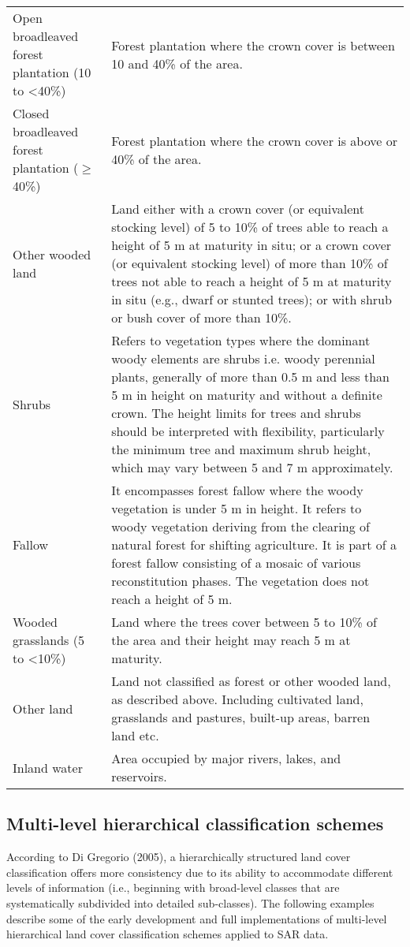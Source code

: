 \begin{spacing}{1.0}
\begin{longtable}[h!]{ p{3.5cm} p{10.5cm} }
	Open broadleaved forest plantation (10 to \textless 40\%) & Forest plantation where the crown cover is between 10 and 40\% of the area.\\[18pt]
	Closed broadleaved forest plantation ($\geq$ 40\%) & Forest plantation where the crown cover is above or 40\% of the area.\\[18pt]
	Other wooded land & Land either with a crown cover (or equivalent stocking level) of 5 to 10\% of trees able to reach a height of 5 m at maturity in situ; or a crown cover (or equivalent stocking level) of more than 10\% of trees not able to reach a height of 5 m at maturity in situ (e.g., dwarf or stunted trees); or with shrub or bush cover of more than 10\%.\\[5pt]
	Shrubs & Refers to vegetation types where the dominant woody elements are shrubs i.e. woody perennial plants, generally of more than 0.5 m and less than 5 m in height on maturity and without a definite crown. The height limits for trees and shrubs should be interpreted with flexibility, particularly the minimum tree and maximum shrub height, which may vary between 5 and 7 m approximately.\\[5pt]
	Fallow & It encompasses forest fallow where the woody vegetation is under 5 m in height. It refers to woody vegetation deriving from the clearing of natural forest for shifting agriculture. It is part of a forest fallow consisting of a mosaic of various reconstitution phases. The vegetation does not reach a height of 5 m.\\[5pt]
	Wooded grasslands (5 to \textless 10\%) & Land where the trees cover between 5 to 10\% of the area and their height may reach 5 m at maturity.\\[3pt]
	Other land & Land not classified as forest or other wooded land, as described above. Including cultivated land, grasslands and pastures, built-up areas, barren land etc.\\[5pt]
	Inland water & Area occupied by major rivers, lakes, and reservoirs.\\[3pt]
	
    \bottomrule
\end{longtable}
\end{spacing}

\subsection{Multi-level hierarchical classification schemes}

According to Di Gregorio (2005), a hierarchically structured land cover classification offers more consistency due to its ability to accommodate different levels of information (i.e., beginning with broad-level classes that are systematically subdivided into detailed sub-classes). The following examples describe some of the early development and full implementations of multi-level hierarchical land cover classification schemes applied to SAR data.

